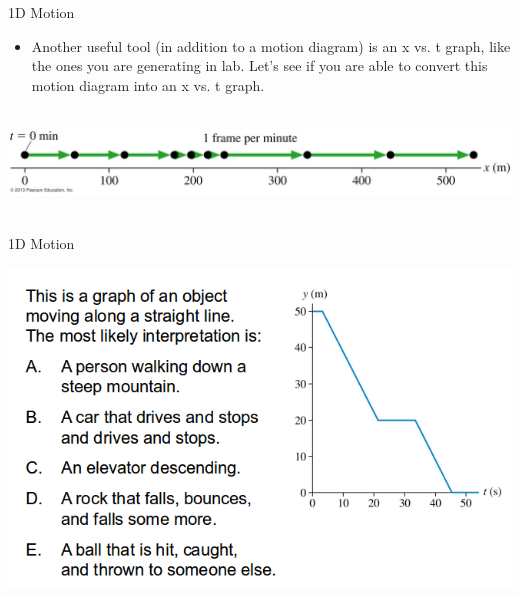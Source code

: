 \documentclass{beamer}
\newcommand{\red}[1]{{\color{red}{#1}}}
\newcommand{\checkH}[2]{\begin{textblock*}{1cm}(#1,#2){\Huge \red{\Checkmark}}\end{textblock*}}
\begin{document}
\begin{frame}{1D Motion}
\begin{itemize}
   \item Another useful tool (in addition to a motion diagram) is an x vs. t graph, like the ones you are generating in lab. Let's see if you are able to convert this motion diagram into an x vs. t graph. \\~\\
\end{itemize}
\begin{center}
   \includegraphics[width=\textwidth]{../figures/01_20_Figure.jpg}
   \\~\\ 
\end{center}
\end{frame}

\begin{frame}{1D Motion}
\begin{center}
   \includegraphics[width=\textwidth]{../figures/QC1_10.png}
   \only<2->{\checkH{0.8cm}{5.0cm}}
\end{center}
\end{frame}
\end{document}
